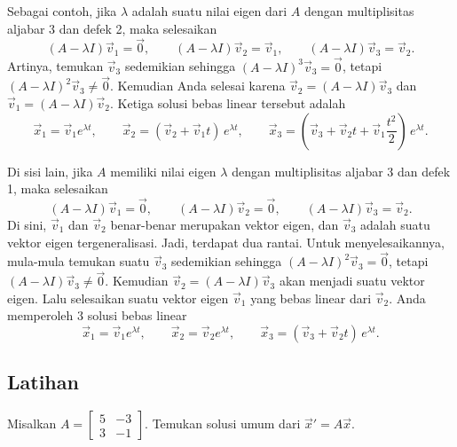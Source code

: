 Sebagai contoh, jika $\lambda$ adalah suatu nilai eigen dari $A$
dengan multiplisitas aljabar 3 dan defek 2, maka selesaikan
\begin{equation*}
(A - \lambda I) \vec{v}_1 = \vec{0} , \qquad
(A - \lambda I) \vec{v}_2 = \vec{v}_1 , \qquad
(A - \lambda I) \vec{v}_3 = \vec{v}_2 .
\end{equation*}
Artinya, temukan $\vec{v}_3$ sedemikian sehingga 
${(A - \lambda I)}^3 \vec{v}_3 = \vec{0}$, tetapi
${(A - \lambda I)}^2 \vec{v}_3 \neq \vec{0}$.
Kemudian Anda selesai karena
$\vec{v}_2 = (A - \lambda I) \vec{v}_3$
dan 
$\vec{v}_1 = (A - \lambda I) \vec{v}_2$.
Ketiga solusi bebas linear tersebut adalah
\begin{equation*}
\vec{x}_1 = \vec{v}_1 e^{\lambda t} , \qquad
\vec{x}_2 = ( \vec{v}_2 + \vec{v}_1 t ) \, e^{\lambda t} , \qquad
\vec{x}_3 = \left( \vec{v}_3 + \vec{v}_2 t +
\vec{v}_{1} \frac{t^2}{2} \right) \, e^{\lambda t} .
\end{equation*}

Di sisi lain, jika $A$ memiliki nilai eigen $\lambda$
dengan multiplisitas aljabar 3 dan defek 1, maka 
selesaikan
\begin{equation*}
(A - \lambda I) \vec{v}_1 = \vec{0} , \qquad
(A - \lambda I) \vec{v}_2 = \vec{0} , \qquad
(A - \lambda I) \vec{v}_3 = \vec{v}_2 .
\end{equation*}
Di sini, $\vec{v}_1$ dan $\vec{v}_2$ benar-benar merupakan vektor eigen,
dan $\vec{v}_3$ adalah suatu vektor eigen tergeneralisasi.
Jadi, terdapat dua rantai.
Untuk menyelesaikannya, mula-mula temukan suatu 
$\vec{v}_3$ sedemikian sehingga 
${(A - \lambda I)}^2 \vec{v}_3 = \vec{0}$, tetapi
$(A - \lambda I) \vec{v}_3 \neq \vec{0}$.
Kemudian $\vec{v}_2 = (A - \lambda I) \vec{v}_3$ akan menjadi suatu vektor eigen.
Lalu selesaikan suatu vektor eigen $\vec{v}_1$ yang bebas linear 
dari $\vec{v}_2$.
Anda memperoleh 3 solusi bebas linear
\begin{equation*}
\vec{x}_1 = \vec{v}_1 e^{\lambda t} , \qquad
\vec{x}_2 = \vec{v}_2 e^{\lambda t} , \qquad
\vec{x}_3 = ( \vec{v}_3 + \vec{v}_2 t ) \, e^{\lambda t} .
\end{equation*}

\subsection{Latihan}

\begin{exercise}
Misalkan
$A = \left[ \begin{smallmatrix} 5 & -3 \\ 3 & -1 \end{smallmatrix} \right]$.
Temukan solusi umum dari ${\vec{x}}' = A \vec{x}$.
\end{exercise}

